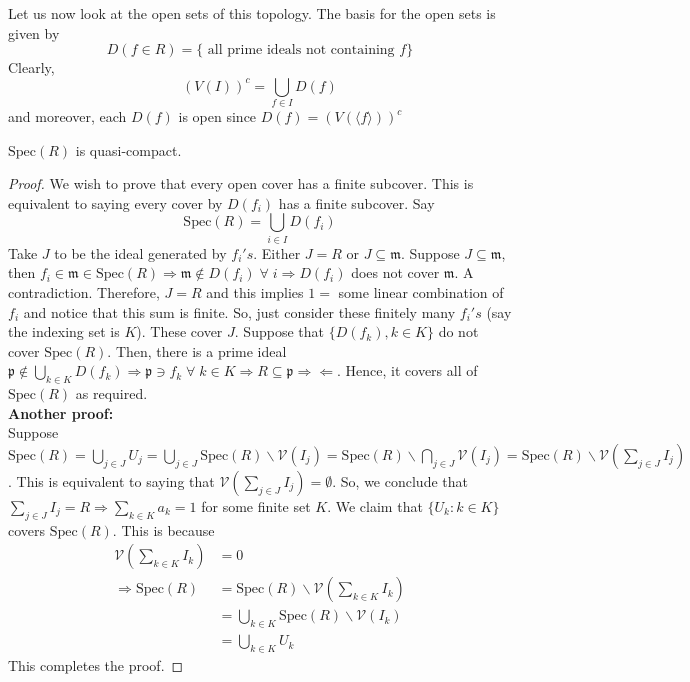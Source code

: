 \documentclass[oneside, 12pt, ]{scrbook}
\newcommand{\V}{\mathcal{V}}
\newcommand{\spec}{\mathrm{Spec}}
\newcommand{\pr}{\mathfrak{p}}
\newcommand{\m}{\mathfrak{m}}
\theoremstyle{theorem}
\begin{document}
Let us now look at the open sets of this topology. The basis for the open sets is given by $$D(f \in R) = \{ \text{ all prime ideals not containing } f\}$$
Clearly, $$(V(I))^c = \bigcup_{f \in I} D(f)$$ and moreover, each $D(f)$ is open since $D(f) = (V(\langle f \rangle))^c$

\begin{theorem}
$\mathrm{Spec}(R)$ is quasi-compact.
\end{theorem}

\begin{proof}
We wish to prove that every open cover has a finite subcover. This is equivalent to saying every cover by $D(f_{i})$ has a finite subcover. Say $$\spec(R) = \bigcup_{i \in I} D(f_{i})$$ Take $J$ to be the ideal generated by $f_{i}'s$. Either $J = R$ or $J \subseteq \mathfrak{m}$. Suppose $J \subseteq \m$, then $f_{i} \in \m \in \spec(R) \Rightarrow \m \not \in D(f_{i}) \; \forall \; i \Rightarrow D(f_{i})$ does not cover $\m$. A contradiction. Therefore, $J=R$ and this implies $1 =$ some linear combination of $f_{i}$ and notice that this sum is finite. So, just consider these finitely many $f_{i}'s$ (say the indexing set is $K$). These cover $J$. Suppose that $\{ D(f_{k}), k \in K\}$ do not cover $\spec(R)$. Then, there is a prime ideal $\pr \not \in \bigcup_{k\in K}D(f_{k}) \Rightarrow \pr \ni f_{k} \; \forall\; k \in K \Rightarrow R \subseteq \pr \Rightarrow \Leftarrow$. Hence, it covers all of $\spec(R)$ as required. \\

\textbf{Another proof:}\\
Suppose $\spec(R) = \bigcup_{j \in J} U_{j} = \bigcup_{j \in J} \spec(R) \backslash \V(I_{j}) = \spec(R) \backslash \bigcap_{j \in J} \V(I_{j}) =\spec(R) \backslash \V(\sum_{j \in J} I_{j})$. This is equivalent to saying that $\V(\sum_{j \in J} I_{j}) = \emptyset$. So, we conclude that $\sum_{j \in J}I_{j} = R \Rightarrow \sum_{k \in K}a_{k} = 1$ for some finite set $K$. We claim that $\{U_{k}: k \in K\}$ covers $\spec(R)$. This is because 
\begin{align*}
\V(\sum_{k\in K} I_{k}) &= 0 \\
\Rightarrow \spec(R) &= \spec(R) \backslash \V(\sum_{k\in K} I_{k})  \\
&= \bigcup_{k \in K} \spec(R) \backslash \V(I_{k}) \\
&= \bigcup_{k \in K} U_{k}
\end{align*}
This completes the proof. 
\end{proof}
\end{document}
